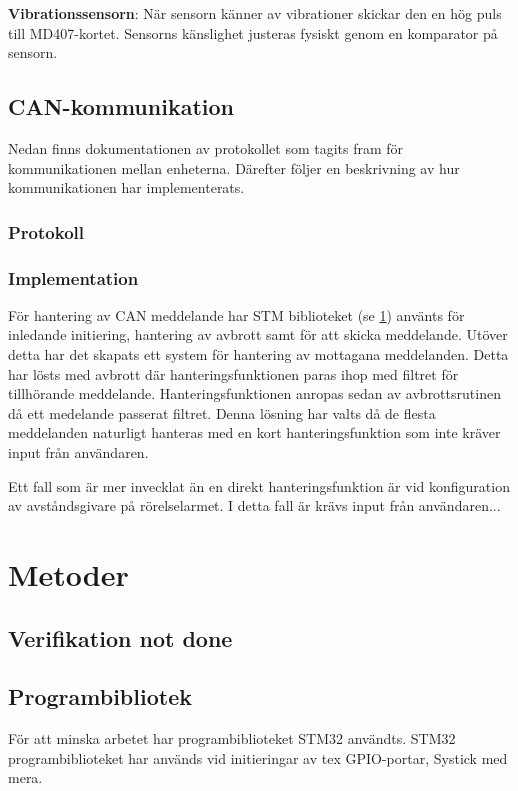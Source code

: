 \documentclass{article}
\begin{document}
\textbf{Vibrationssensorn}: När sensorn känner av vibrationer skickar den en hög puls till MD407-kortet. Sensorns känslighet justeras fysiskt genom en komparator på sensorn.

\subsection{CAN-kommunikation}
\label{can}
Nedan finns dokumentationen av protokollet som tagits fram för 
kommunikationen mellan enheterna. Därefter följer en beskrivning 
av hur kommunikationen har implementerats.
\subsubsection{Protokoll}

\subsubsection{Implementation}
För hantering av CAN meddelande har STM biblioteket (se \ref{stm}) använts för inledande initiering, hantering av avbrott samt för att skicka meddelande.
Utöver detta har det skapats ett system för hantering av mottagana meddelanden.
Detta har lösts med avbrott där hanteringsfunktionen paras ihop med filtret för tillhörande meddelande.
Hanteringsfunktionen anropas sedan av avbrottsrutinen då ett medelande passerat filtret.
Denna lösning har valts då de flesta meddelanden naturligt hanteras med en kort hanteringsfunktion som inte kräver input från användaren.

Ett fall som är mer invecklat än en direkt hanteringsfunktion är vid konfiguration av avståndsgivare på rörelselarmet. I detta fall är krävs input från användaren... 





\section{Metoder}
\label{stm}
\subsection{Verifikation not done}
\subsection{Programbibliotek}
För att minska arbetet har programbiblioteket STM32\cite{stm}
användts. 
STM32 programbiblioteket har används vid initieringar av tex GPIO-portar, Systick med mera.
\end{document}
